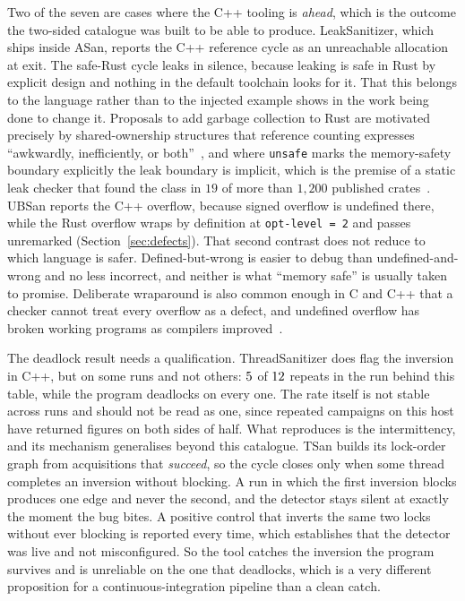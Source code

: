 \documentclass[english,oneside,a4paper,censored,csm,software-track-2020]{HYthesisML}
\begin{document}
Two of the seven are cases where the C++ tooling is \emph{ahead}, which is the outcome the
two-sided catalogue was built to be able to produce. LeakSanitizer, which ships inside ASan,
reports the C++ reference cycle as an unreachable allocation at exit. The safe-Rust cycle leaks
in silence, because leaking is safe in Rust by explicit design and nothing in the default
toolchain looks for it. That this belongs to the language rather than to the injected example
shows in the work being done to change it. Proposals to add garbage
collection to Rust are motivated precisely by shared-ownership structures that reference counting
expresses ``awkwardly, inefficiently, or both''~\cite{hughes2025gcrust}, and where \texttt{unsafe}
marks the memory-safety boundary explicitly the leak boundary is implicit, which is the premise of
a static leak checker that found the class in $19$ of more than
$1{,}200$ published crates~\cite{cui2024rcanary}. UBSan reports the C++ overflow, because signed
overflow is undefined there, while the Rust overflow wraps by definition at
\texttt{opt-level~=~2} and passes unremarked (Section~\ref{sec:defects}). That second contrast
does not reduce to which language is safer. Defined-but-wrong is easier to debug than
undefined-and-wrong and no less incorrect, and neither is what ``memory safe'' is usually taken
to promise. Deliberate wraparound is also common
enough in C and C++ that a checker cannot treat every overflow as a defect, and undefined overflow
has broken working programs as compilers improved~\cite{dietz2015overflow}.

The deadlock result needs a qualification.
ThreadSanitizer does flag the inversion in C++, but on some runs and not others:
$5$ of $12$ repeats in the run behind this table, while the
program deadlocks on every one. The rate itself is not stable across runs and should not be read
as one, since repeated campaigns on this host have returned figures on both sides of half. What
reproduces is the intermittency, and its mechanism generalises beyond this catalogue. TSan builds
its lock-order
graph from acquisitions that \emph{succeed}, so the cycle closes only when some thread completes
an inversion without blocking. A run in which the first inversion blocks produces one edge and
never the second, and the detector stays silent at exactly the moment the bug bites. A
positive control that inverts the same two locks without ever blocking is reported every time,
which establishes that the detector was live and not misconfigured. So the tool catches the
inversion the program survives and is unreliable on the one that deadlocks, which is a very
different proposition for a continuous-integration pipeline than a clean catch.
\end{document}
